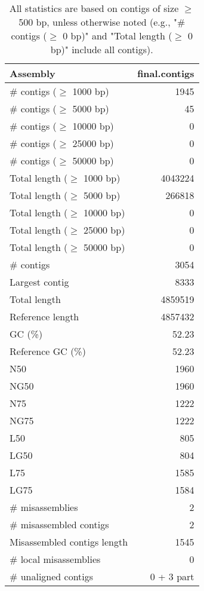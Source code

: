 \documentclass[12pt,a4paper]{article}
\begin{document}
\begin{table}[ht]
\begin{center}
\caption{All statistics are based on contigs of size $\geq$ 500 bp, unless otherwise noted (e.g., "\# contigs ($\geq$ 0 bp)" and "Total length ($\geq$ 0 bp)" include all contigs).}
\begin{tabular}{|l*{1}{|r}|}
\hline
Assembly & final.contigs \\ \hline
\# contigs ($\geq$ 1000 bp) & 1945 \\ \hline
\# contigs ($\geq$ 5000 bp) & 45 \\ \hline
\# contigs ($\geq$ 10000 bp) & 0 \\ \hline
\# contigs ($\geq$ 25000 bp) & 0 \\ \hline
\# contigs ($\geq$ 50000 bp) & 0 \\ \hline
Total length ($\geq$ 1000 bp) & 4043224 \\ \hline
Total length ($\geq$ 5000 bp) & 266818 \\ \hline
Total length ($\geq$ 10000 bp) & 0 \\ \hline
Total length ($\geq$ 25000 bp) & 0 \\ \hline
Total length ($\geq$ 50000 bp) & 0 \\ \hline
\# contigs & 3054 \\ \hline
Largest contig & 8333 \\ \hline
Total length & 4859519 \\ \hline
Reference length & 4857432 \\ \hline
GC (\%) & 52.23 \\ \hline
Reference GC (\%) & 52.23 \\ \hline
N50 & 1960 \\ \hline
NG50 & 1960 \\ \hline
N75 & 1222 \\ \hline
NG75 & 1222 \\ \hline
L50 & 805 \\ \hline
LG50 & 804 \\ \hline
L75 & 1585 \\ \hline
LG75 & 1584 \\ \hline
\# misassemblies & 2 \\ \hline
\# misassembled contigs & 2 \\ \hline
Misassembled contigs length & 1545 \\ \hline
\# local misassemblies & 0 \\ \hline
\# unaligned contigs & 0 + 3 part \\ \hline

\end{tabular}
\end{center}
\end{table}
\end{document}

